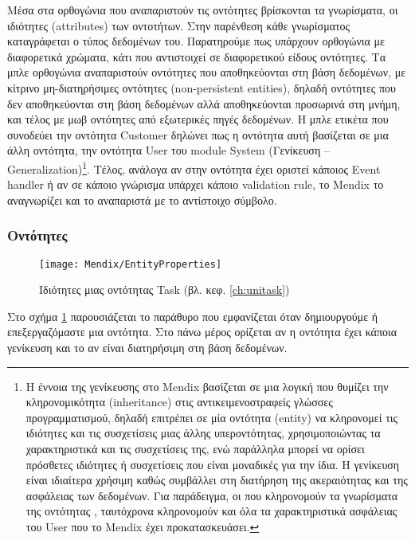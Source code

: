             Μέσα στα ορθογώνια που αναπαριστούν τις οντότητες βρίσκονται τα γνωρίσματα, οι ιδιότητες (attributes) των οντοτήτων. Στην παρένθεση κάθε γνωρίσματος καταγράφεται ο τύπος δεδομένων του. Παρατηρούμε πως υπάρχουν ορθογώνια με διαφορετικά χρώματα, κάτι που αντιστοιχεί σε διαφορετικού είδους οντότητες. Τα μπλε ορθογώνια αναπαριστούν οντότητες που αποθηκεύονται στη βάση δεδομένων, με κίτρινο μη-διατηρήσιμες οντότητες (non-persistent entities), δηλαδή οντότητες που δεν αποθηκεύονται στη βάση δεδομένων αλλά αποθηκεύονται προσωρινά στη μνήμη, και τέλος με μωβ οντότητες από εξωτερικές πηγές δεδομένων. Η μπλε ετικέτα  που συνοδεύει την οντότητα Customer δηλώνει πως η οντότητα αυτή βασίζεται σε μια άλλη οντότητα, την οντότητα User του module System (Γενίκευση -- Generalization)\footnote{Η έννοια της γενίκευσης στο Mendix βασίζεται σε μια λογική που θυμίζει την κληρονομικότητα (inheritance) στις αντικειμενοστραφείς γλώσσες προγραμματισμού, δηλαδή επιτρέπει σε μία οντότητα (entity) να κληρονομεί τις ιδιότητες και τις συσχετίσεις μιας άλλης υπεροντότητας, χρησιμοποιώντας τα χαρακτηριστικά και τις συσχετίσεις της, ενώ παράλληλα μπορεί να ορίσει πρόσθετες ιδιότητες ή συσχετίσεις που είναι μοναδικές για την ίδια. Η γενίκευση είναι ιδιαίτερα χρήσιμη καθώς συμβάλλει στη διατήρηση της ακεραιότητας και της ασφάλειας των δεδομένων. Για παράδειγμα, οι  που κληρονομούν τα γνωρίσματα της οντότητας , ταυτόχρονα κληρονομούν και όλα τα χαρακτηριστικά ασφάλειας του User που το Mendix έχει προκατασκευάσει.}. Τέλος, ανάλογα αν στην οντότητα έχει οριστεί κάποιος Event handler ή αν σε κάποιο γνώρισμα υπάρχει κάποιο validation rule, το Mendix το αναγνωρίζει και το αναπαριστά με το αντίστοιχο σύμβολο.

            \subsubsection{Οντότητες}
                \begin{figure}[h!] \noindent \centering
                        \texttt{[image: Mendix/EntityProperties]}
                        \caption{\centering Ιδιότητες μιας οντότητας Task (βλ. κεφ. \ref{ch:unitask})}
                        \label{fig:MendixEntityProperties}
                \end{figure}

                Στο σχήμα \ref{fig:MendixEntityProperties} παρουσιάζεται το παράθυρο που εμφανίζεται όταν δημιουργούμε ή επεξεργαζόμαστε μια οντότητα. Στο πάνω μέρος ορίζεται αν η οντότητα έχει κάποια γενίκευση και το αν είναι διατηρήσιμη στη βάση δεδομένων.

